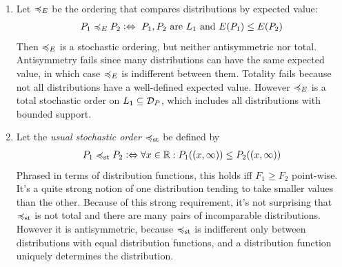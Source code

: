 \documentclass[a4paper]{scrreprt}
\begin{document}
    \begin{ex}~
        \begin{enumerate}
            \item 
            Let $\preccurlyeq_E$ be the ordering that compares distributions by expected value:
            \begin{gather*}
                P_1 \preccurlyeq_E P_2 \mathrel{\vcentcolon\Leftrightarrow} \text{ $P_1, P_2$ are $L_1$ and $E(P_1) \leq E(P_2)$} 
            \end{gather*}
            Then $\preccurlyeq_E$ is a stochastic ordering, but neither antisymmetric nor total. Antisymmetry fails since many distributions can have the same expected value, in which case $\preccurlyeq_E$ is indifferent between them. Totality fails because not all distributions have a well-defined expected value. However $\preccurlyeq_E$ is a total stochastic order on $L_1 \subseteq \mathcal{D}_P$, which includes all distributions with bounded support.
            
            \item Let the \emph{usual stochastic order} \cite{bib:shakedStochasticOrders} $\preccurlyeq_{\text{st}}$ be defined by
            \begin{gather*}
                P_1 \preccurlyeq_{\text{st}} P_2 \mathrel{\vcentcolon\Leftrightarrow} \forall x \in \mathbb{R}: P_1((x, \infty)) \leq P_2((x, \infty))
            \end{gather*}
            Phrased in terms of distribution functions, this holds iff $F_1 \geq F_2$ point-wise. It's a quite strong notion of one distribution tending to take smaller values than the other. Because of this strong requirement, it's not surprising that $\preccurlyeq_{\text{st}}$ is not total and there are many pairs of incomparable distributions. However it is antisymmetric, because $\preccurlyeq_{\text{st}}$ is indifferent only between distributions with equal distribution functions, and a distribution function uniquely determines the distribution.
        \end{enumerate}
    \end{ex}

    \let\dpref\dgeq
    \let\dnonpref\dleq
    \let\dstrpref\dgreater
    \let\dstrnonpref\dless
    
\end{document}
